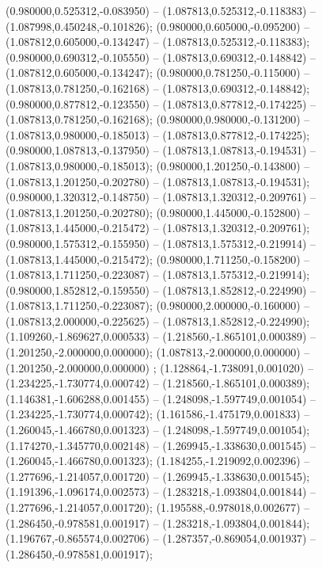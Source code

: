  (0.980000,0.525312,-0.083950) -- (1.087813,0.525312,-0.118383) -- (1.087998,0.450248,-0.101826);
 (0.980000,0.605000,-0.095200) -- (1.087812,0.605000,-0.134247) -- (1.087813,0.525312,-0.118383);
 (0.980000,0.690312,-0.105550) -- (1.087813,0.690312,-0.148842) -- (1.087812,0.605000,-0.134247);
 (0.980000,0.781250,-0.115000) -- (1.087813,0.781250,-0.162168) -- (1.087813,0.690312,-0.148842);
 (0.980000,0.877812,-0.123550) -- (1.087813,0.877812,-0.174225) -- (1.087813,0.781250,-0.162168);
 (0.980000,0.980000,-0.131200) -- (1.087813,0.980000,-0.185013) -- (1.087813,0.877812,-0.174225);
 (0.980000,1.087813,-0.137950) -- (1.087813,1.087813,-0.194531) -- (1.087813,0.980000,-0.185013);
 (0.980000,1.201250,-0.143800) -- (1.087813,1.201250,-0.202780) -- (1.087813,1.087813,-0.194531);
 (0.980000,1.320312,-0.148750) -- (1.087813,1.320312,-0.209761) -- (1.087813,1.201250,-0.202780);
 (0.980000,1.445000,-0.152800) -- (1.087813,1.445000,-0.215472) -- (1.087813,1.320312,-0.209761);
 (0.980000,1.575312,-0.155950) -- (1.087813,1.575312,-0.219914) -- (1.087813,1.445000,-0.215472);
 (0.980000,1.711250,-0.158200) -- (1.087813,1.711250,-0.223087) -- (1.087813,1.575312,-0.219914);
 (0.980000,1.852812,-0.159550) -- (1.087813,1.852812,-0.224990) -- (1.087813,1.711250,-0.223087);
 (0.980000,2.000000,-0.160000) -- (1.087813,2.000000,-0.225625) -- (1.087813,1.852812,-0.224990);
 (1.109260,-1.869627,0.000533) -- (1.218560,-1.865101,0.000389) -- (1.201250,-2.000000,0.000000);
 (1.087813,-2.000000,0.000000) -- (1.201250,-2.000000,0.000000) ;
 (1.128864,-1.738091,0.001020) -- (1.234225,-1.730774,0.000742) -- (1.218560,-1.865101,0.000389);
 (1.146381,-1.606288,0.001455) -- (1.248098,-1.597749,0.001054) -- (1.234225,-1.730774,0.000742);
 (1.161586,-1.475179,0.001833) -- (1.260045,-1.466780,0.001323) -- (1.248098,-1.597749,0.001054);
 (1.174270,-1.345770,0.002148) -- (1.269945,-1.338630,0.001545) -- (1.260045,-1.466780,0.001323);
 (1.184255,-1.219092,0.002396) -- (1.277696,-1.214057,0.001720) -- (1.269945,-1.338630,0.001545);
 (1.191396,-1.096174,0.002573) -- (1.283218,-1.093804,0.001844) -- (1.277696,-1.214057,0.001720);
 (1.195588,-0.978018,0.002677) -- (1.286450,-0.978581,0.001917) -- (1.283218,-1.093804,0.001844);
 (1.196767,-0.865574,0.002706) -- (1.287357,-0.869054,0.001937) -- (1.286450,-0.978581,0.001917);

